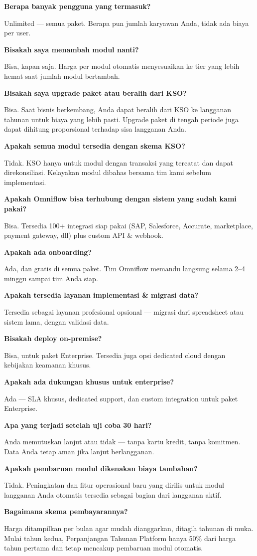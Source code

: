 \documentclass[a4paper]{article}
\newcommand{\faqitem}[2]{%
    {\fontsize{9.5}{12}\selectfont\bfseries\color{BlueDark} #1}\par\vspace{2pt}%
    {\fontsize{9}{12}\selectfont\color{TextDark} #2}\par\vspace{9pt}%
}
\begin{document}
\noindent
\begin{minipage}[t]{0.485\textwidth}
    \faqitem{Berapa banyak pengguna yang termasuk?}{Unlimited --- semua paket. Berapa pun jumlah karyawan Anda, tidak ada biaya per user.}
    \faqitem{Bisakah saya menambah modul nanti?}{Bisa, kapan saja. Harga per modul otomatis menyesuaikan ke tier yang lebih hemat saat jumlah modul bertambah.}
    \faqitem{Bisakah saya upgrade paket atau beralih dari KSO?}{Bisa. Saat bisnis berkembang, Anda dapat beralih dari KSO ke langganan tahunan untuk biaya yang lebih pasti. Upgrade paket di tengah periode juga dapat dihitung proporsional terhadap sisa langganan Anda.}
    \faqitem{Apakah semua modul tersedia dengan skema KSO?}{Tidak. KSO hanya untuk modul dengan transaksi yang tercatat dan dapat direkonsiliasi. Kelayakan modul dibahas bersama tim kami sebelum implementasi.}
    \faqitem{Apakah Omniflow bisa terhubung dengan sistem yang sudah kami pakai?}{Bisa. Tersedia 100+ integrasi siap pakai (SAP, Salesforce, Accurate, marketplace, payment gateway, dll) plus custom API \& webhook.}
    \faqitem{Apakah ada onboarding?}{Ada, dan gratis di semua paket. Tim Omniflow memandu langsung selama 2--4 minggu sampai tim Anda siap.}
\end{minipage}%
\hfill
\begin{minipage}[t]{0.485\textwidth}
    \faqitem{Apakah tersedia layanan implementasi \& migrasi data?}{Tersedia sebagai layanan profesional opsional --- migrasi dari spreadsheet atau sistem lama, dengan validasi data.}
    \faqitem{Bisakah deploy on-premise?}{Bisa, untuk paket Enterprise. Tersedia juga opsi dedicated cloud dengan kebijakan keamanan khusus.}
    \faqitem{Apakah ada dukungan khusus untuk enterprise?}{Ada --- SLA khusus, dedicated support, dan custom integration untuk paket Enterprise.}
    \faqitem{Apa yang terjadi setelah uji coba 30 hari?}{Anda memutuskan lanjut atau tidak --- tanpa kartu kredit, tanpa komitmen. Data Anda tetap aman jika lanjut berlangganan.}
    \faqitem{Apakah pembaruan modul dikenakan biaya tambahan?}{Tidak. Peningkatan dan fitur operasional baru yang dirilis untuk modul langganan Anda otomatis tersedia sebagai bagian dari langganan aktif.}
    \faqitem{Bagaimana skema pembayarannya?}{Harga ditampilkan per bulan agar mudah dianggarkan, ditagih tahunan di muka. Mulai tahun kedua, Perpanjangan Tahunan Platform hanya 50\% dari harga tahun pertama dan tetap mencakup pembaruan modul otomatis.}
\end{minipage}

\vspace{4pt}
\end{document}
